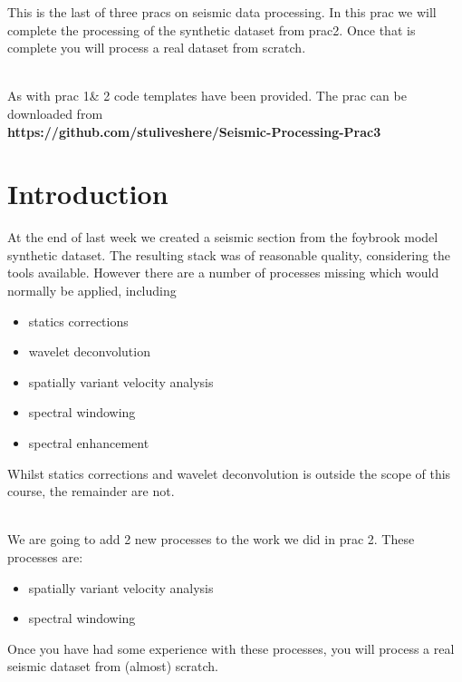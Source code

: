 

\maketitle %
This is the last of three pracs on seismic data processing.  In this prac we will complete the processing of the synthetic dataset from prac2.   Once that is complete you will process a real dataset from scratch.
\par~\\
As with prac 1\& 2 code templates have been provided. The prac can be downloaded from  \\ \textbf{https://github.com/stuliveshere/Seismic-Processing-Prac3}

\section*{Introduction}
At the end of last week we created a seismic section from the foybrook model synthetic dataset. The resulting stack was of reasonable quality, considering the tools available.  However there are a number of processes missing which would normally be applied, including

\begin{itemize}
\item statics corrections
\item wavelet deconvolution
\item spatially variant velocity analysis
\item spectral windowing
\item spectral enhancement
\end{itemize}

Whilst statics corrections and wavelet deconvolution is outside the scope of this course, the remainder are not.
\par~\\
We are going to add 2 new processes to the work we did in prac 2. These processes are:

\begin{itemize}
\item spatially variant velocity analysis
\item spectral windowing
\end{itemize}

Once you have had some experience with these processes, you will process a real seismic dataset from (almost) scratch.

  
